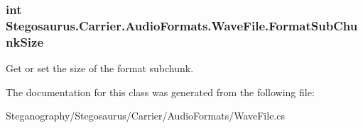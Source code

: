 \subsubsection[{\texorpdfstring{Format\+Sub\+Chunk\+Size}{FormatSubChunkSize}}]{\setlength{\rightskip}{0pt plus 5cm}int Stegosaurus.\+Carrier.\+Audio\+Formats.\+Wave\+File.\+Format\+Sub\+Chunk\+Size\hspace{0.3cm}{\ttfamily [get]}}\hypertarget{class_stegosaurus_1_1_carrier_1_1_audio_formats_1_1_wave_file_a5981b47062913ff15855b36e4c20ff7c}{}\label{class_stegosaurus_1_1_carrier_1_1_audio_formats_1_1_wave_file_a5981b47062913ff15855b36e4c20ff7c}


Get or set the size of the format subchunk. 



The documentation for this class was generated from the following file\+:\begin{DoxyCompactItemize}
\item 
Steganography/\+Stegosaurus/\+Carrier/\+Audio\+Formats/Wave\+File.\+cs\end{DoxyCompactItemize}

